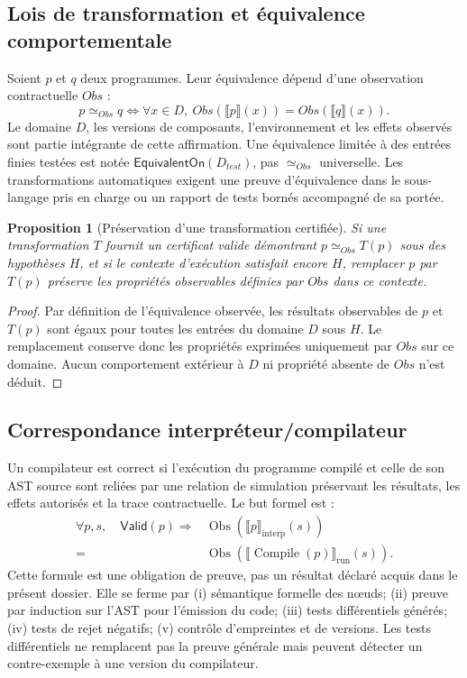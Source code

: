 \documentclass[11pt,a4paper]{article}
\theoremstyle{definition}
\theoremstyle{plain}
\newtheorem{proposition}[definition]{Proposition}
\theoremstyle{remark}
\begin{document}
\subsection{Lois de transformation et équivalence comportementale}
Soient $p$ et $q$ deux programmes. Leur équivalence dépend d'une observation contractuelle $Obs$ :
\[
p\simeq_{Obs}q\iff\forall x\in D,\ Obs(\llbracket p\rrbracket(x))=Obs(\llbracket q\rrbracket(x)).
\]
Le domaine $D$, les versions de composants, l'environnement et les effets observés sont partie intégrante de cette affirmation. Une équivalence limitée à des entrées finies testées est notée $\mathsf{EquivalentOn}(D_{test})$, pas $\simeq_{Obs}$ universelle. Les transformations automatiques exigent une preuve d'équivalence dans le sous-langage pris en charge ou un rapport de tests bornés accompagné de sa portée.

\begin{proposition}[Préservation d'une transformation certifiée]
Si une transformation $T$ fournit un certificat valide démontrant $p\simeq_{Obs}T(p)$ sous des hypothèses $H$, et si le contexte d'exécution satisfait encore $H$, remplacer $p$ par $T(p)$ préserve les propriétés observables définies par $Obs$ dans ce contexte.
\end{proposition}
\begin{proof}
Par définition de l'équivalence observée, les résultats observables de $p$ et $T(p)$ sont égaux pour toutes les entrées du domaine $D$ sous $H$. Le remplacement conserve donc les propriétés exprimées uniquement par $Obs$ sur ce domaine. Aucun comportement extérieur à $D$ ni propriété absente de $Obs$ n'est déduit.
\end{proof}

\subsection{Correspondance interpréteur/compilateur}
Un compilateur est correct si l'exécution du programme compilé et celle de son AST source sont reliées par une relation de simulation préservant les résultats, les effets autorisés et la trace contractuelle. Le but formel est :
\[
\begin{aligned}
\forall p,s,\quad \mathsf{Valid}(p)\Rightarrow {}&
\operatorname{Obs}(\llbracket p\rrbracket_{\mathrm{interp}}(s))\\
={}&\operatorname{Obs}(\llbracket \operatorname{Compile}(p)\rrbracket_{\mathrm{run}}(s)).
\end{aligned}
\]
Cette formule est une obligation de preuve, pas un résultat déclaré acquis dans le présent dossier. Elle se ferme par (i) sémantique formelle des nœuds; (ii) preuve par induction sur l'AST pour l'émission du code; (iii) tests différentiels générés; (iv) tests de rejet négatifs; (v) contrôle d'empreintes et de versions. Les tests différentiels ne remplacent pas la preuve générale mais peuvent détecter un contre-exemple à une version du compilateur.
\end{document}
